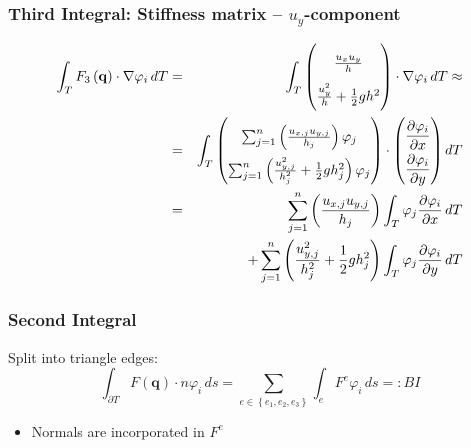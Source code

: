 \documentclass{beamer}
\newcommand{\pd}[2]{\dfrac{\partial #1}{\partial #2}}
\renewcommand{\phi}{\varphi}
\begin{document}
\begin{frame}
  \frametitle{Third Integral: Stiffness matrix -- $u_y$-component}
  \begin{eqnarray*}
    \int_T F_3\left(\mathbf{q}\right) \cdot \nabla \phi_i \, dT &=&
    \int_T
    \begin{pmatrix}
      \frac{u_x u_y}{h} \\ \frac{u_y^2}{h} + \frac{1}{2} g h^2 
    \end{pmatrix}
    \cdot \nabla \phi_i \, dT \approx \\
    &=& \int_T 
    \begin{pmatrix}
      \sum_{j=1}^n \left(\frac{u_{x,j} u_{y,j}}{h_j}\right) \phi_j \\
      \sum_{j=1}^n \left(\frac{u_{y,j}^2}{h_j^2} + \frac{1}{2} g h_j^2\right) \phi_j \\
    \end{pmatrix}
    \cdot 
    {
      \renewcommand{\arraystretch}{2}
      \begin{pmatrix}
        \pd{\phi_i}{x} \\
        \pd{\phi_i}{y} 
      \end{pmatrix} dT 
    } \\
    &=& \sum_{j=1}^n \left(\frac{u_{x,j} u_{y,j}}{h_j}\right) \int_T \phi_j \pd{\phi_i}{x} \, dT \\
    &&+ \sum_{j=1}^n \left(\frac{u_{y,j}^2}{h_j^2} + \frac{1}{2} g h_j^2\right) \int_T \phi_j \pd{\phi_i}{y} \, dT
  \end{eqnarray*}

\end{frame}

\begin{frame}
  \frametitle{Second Integral}
  Split into triangle edges:
  \begin{equation}
    \label{eq:border-integral-sum}
    \int_{\partial T} F(\mathbf{q}) \cdot n \phi_i \, ds = \sum_{e\in\left\{ e_1,e_2,e_3 \right\}} \int_{e} F^e \phi_i \, ds =: BI
  \end{equation}
  \begin{itemize}
  \item Normals are incorporated in $F^e$
  \end{itemize}
\end{frame}
\end{document}
